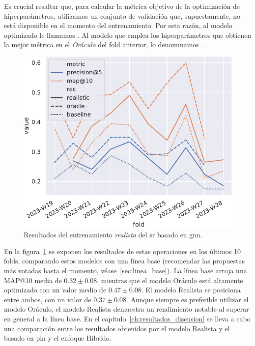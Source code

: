 Es crucial resaltar que, para calcular la métrica objetivo de la optimización de hiperparámetros, utilizamos un conjunto de validación que, supuestamente, no está disponible en el momento del entrenamiento. Por esta razón, al modelo optimizado le llamamos . Al modelo que emplea los hiperparámetros que obtienen la mejor métrica en el \textit{Oráculo} del fold anterior, lo denominamos .

\begin{figure}
    \centering
    \includegraphics[width=\linewidth]{figures/04_implementacion/09_gnn_results.pdf}
    \caption[Resultados del entrenamiento realista del Sistema Recomendador basado en \textit{Graph Neural Networks}]{Resultados del entrenamiento \textit{realista} del \gls{sr} basado en \gls{gnn}.}
    \label{fig:gnn-realistic}
\end{figure}

En la figura~\ref{fig:gnn-realistic} se exponen los resultados de estas operaciones en los últimos 10 folds, comparando estos modelos con una línea base (recomendar las propuestas más votadas hasta el momento, véase~\ref{sec:linea_base}). La línea base arroja una MAP@10 media de $0.32\pm0.08$, mientras que el modelo Oráculo está altamente optimizado con un valor medio de $0.47\pm0.08$. El modelo Realista se posiciona entre ambos, con un valor de $0.37\pm0.08$. Aunque siempre es preferible utilizar el modelo Oráculo, el modelo Realista demuestra un rendimiento notable al superar en general a la línea base. En el capítulo~\ref{ch:resultados_discusion} se lleva a cabo una comparación entre los resultados obtenidos por el modelo Realista y el basado en \gls{pln} y el enfoque Híbrido.

